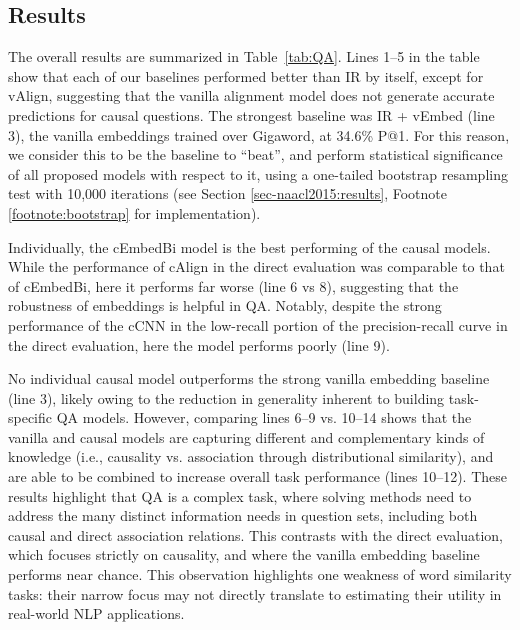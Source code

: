 \subsection{Results}
The overall results are summarized in Table~\ref{tab:QA}.
Lines 1--5 in the table show that each of our baselines performed better than IR by itself, except for vAlign, suggesting that the vanilla alignment model does not generate accurate predictions for causal questions.
The strongest baseline was IR + vEmbed (line 3), the vanilla embeddings trained over Gigaword, at 34.6\% P@1. For this reason, we consider this to be the baseline to ``beat'', and perform statistical significance of all proposed models with respect to it, using a one-tailed bootstrap resampling test with 10,000 iterations (see Section \ref{sec-naacl2015:results}, Footnote \ref{footnote:bootstrap} for implementation). 

Individually, the cEmbedBi model is the best performing of the causal models.  While the performance of cAlign in the direct evaluation was comparable to that of cEmbedBi, here it performs far worse (line 6 vs 8), suggesting that the robustness of embeddings is helpful in QA.  Notably, despite the strong performance of the cCNN in the low-recall portion of the precision-recall curve in the direct evaluation, here the model performs poorly (line 9).

No individual causal model outperforms the strong vanilla embedding baseline (line 3), likely owing to the reduction in generality inherent to building task-specific QA models.
However, comparing lines 6--9 vs. 10--14 shows that the vanilla and causal models are capturing different and complementary kinds of knowledge (i.e., causality vs. association through distributional similarity), and are able to be combined to increase overall task performance (lines 10--12).  These results highlight that QA is a complex task, where solving methods need to address the many distinct information needs in question sets, including both causal and direct association relations.  This contrasts with the direct evaluation, which focuses strictly on causality, and where the vanilla embedding baseline performs near chance. This observation highlights one weakness of word similarity tasks: their narrow focus may not directly translate to estimating their utility in real-world NLP applications. %

